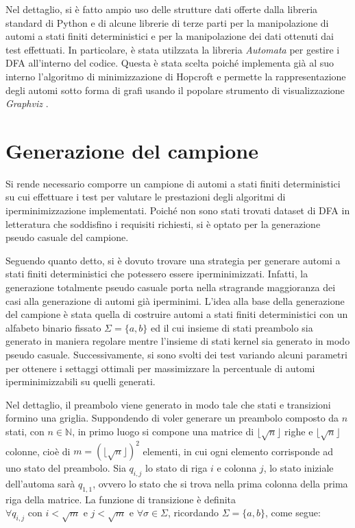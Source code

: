 \documentclass[a4paper,12pt]{report} %
\begin{document}
Nel dettaglio, si è fatto ampio uso delle strutture dati offerte dalla libreria standard di Python e 
di alcune librerie di terze parti per la manipolazione di automi a stati finiti deterministici e per la 
manipolazione dei dati ottenuti dai test effettuati. In particolare, è stata utilzzata la 
libreria \emph{Automata} \parencite{Automata} per gestire i DFA all'interno del codice. Questa
è stata scelta poiché implementa già al suo interno l'algoritmo di minimizzazione di Hopcroft e permette la
rappresentazione degli automi sotto forma di grafi usando il popolare strumento di visualizzazione 
\emph{Graphviz} \parencite{Graphviz}.

\section{Generazione del campione}
\label{sec:sample-generation}

Si rende necessario comporre un campione di automi a stati finiti deterministici su cui effettuare i test
per valutare le prestazioni degli algoritmi di iperminimizzazione implementati. Poiché non sono stati trovati
dataset di DFA in letteratura che soddisfino i requisiti richiesti,
si è optato per la generazione pseudo casuale del campione.

Seguendo quanto detto, si è dovuto trovare una strategia per generare automi a stati finiti deterministici
che potessero essere iperminimizzati. Infatti, la generazione totalmente pseudo casuale porta nella stragrande
maggioranza dei casi alla generazione di automi già iperminimi.
L'idea alla base della generazione del campione è stata quella di costruire automi a stati finiti deterministici
con un alfabeto binario fissato $\Sigma = \{a, b\}$ ed il cui insieme di stati preambolo sia generato in maniera
regolare mentre l'insieme di stati kernel sia generato in modo pseudo casuale. Successivamente, si sono svolti 
dei test variando alcuni parametri per ottenere i settaggi ottimali per massimizzare la percentuale di automi
iperminimizzabili su quelli generati.

Nel dettaglio, il preambolo viene generato in modo tale che stati e transizioni formino una griglia. Suppondendo di
voler generare un preambolo composto da $n$ stati, con $n \in \mathbb{N}$, in primo luogo si compone 
una matrice di $\lfloor \sqrt{n} \rfloor$ righe e $\lfloor \sqrt{n} \rfloor$ colonne, cioè 
di $m = ( \lfloor \sqrt{n} \rfloor )^2$ elementi, in cui ogni elemento 
corrisponde ad uno stato del preambolo. Sia $q_{i,j}$ lo stato di riga $i$ e colonna $j$, lo stato iniziale
dell'automa sarà $q_{1,1}$, ovvero lo stato che si trova nella prima colonna della prima riga della matrice.
La funzione di transizione è definita $\forall q_{i,j} \text{ con } i < \sqrt{m} \text{ e } j < \sqrt{m}$ e 
$\forall \sigma \in \Sigma$, ricordando $\Sigma = \{a, b\}$, come segue:
\end{document}
